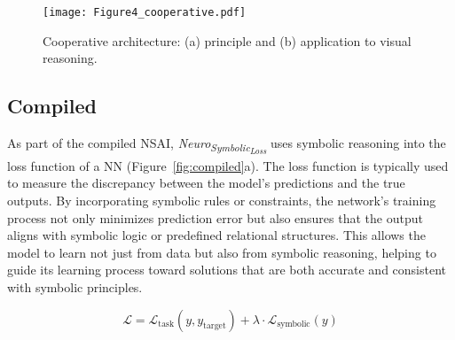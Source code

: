 \documentclass[12pt]{article}
\begin{document}
\begin{figure}[!h]
    \centering
    \texttt{[image: Figure4\_cooperative.pdf]}
    \caption{Cooperative architecture: (a) principle and (b) application to visual reasoning.}
    \label{fig:cooperative}
\end{figure}


\subsection{Compiled}
As part of the compiled NSAI, \textit{Neuro\textsubscript{Symbolic\textsubscript{Loss}}} uses symbolic reasoning into the loss function of a NN (Figure~\ref{fig:compiled}a). The loss function is typically used to measure the discrepancy between the model's predictions and the true outputs. By incorporating symbolic rules or constraints, the network’s training process not only minimizes prediction error but also ensures that the output aligns with symbolic logic or predefined relational structures. This allows the model to learn not just from data but also from symbolic reasoning, helping to guide its learning process toward solutions that are both accurate and consistent with symbolic principles.

\begin{equation}
 \mathcal{L} = \mathcal{L}_\text{task}(y, y_\text{target}) + \lambda \cdot \mathcal{L}_\text{symbolic}(y)   
\end{equation}
\end{document}
